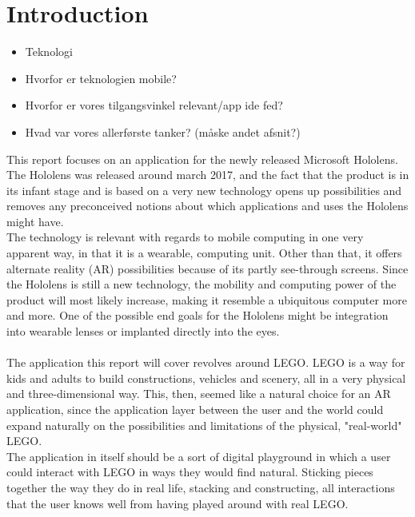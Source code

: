 
\section{Introduction}
\begin{itemize}
\item Teknologi
\item Hvorfor er teknologien mobile?
\item Hvorfor er vores tilgangsvinkel relevant/app ide fed?
\item Hvad var vores allerførste tanker? (måske andet afsnit?)
\end{itemize}

This report focuses on an application for the newly released Microsoft Hololens. The Hololens was released around march 2017, and the fact that the product is in its infant stage and is based on a very new technology opens up possibilities and removes any preconceived notions about which applications and uses the Hololens might have.\\
The technology is relevant with regards to mobile computing in one very apparent way, in that it is a wearable, computing unit. Other than that, it offers alternate reality (AR) possibilities because of its partly see-through screens. Since the Hololens is still a new technology, the mobility and computing power of the product will most likely increase, making it resemble a ubiquitous computer more and more. One of the possible end goals for the Hololens might be integration into wearable lenses or implanted directly into the eyes.\\\\
The application this report will cover revolves around LEGO. LEGO is a way for kids and adults to build constructions, vehicles and scenery, all in a very physical and three-dimensional way. This, then, seemed like a natural choice for an AR application, since the application layer between the user and the world could expand naturally on the possibilities and limitations of the physical, "real-world" LEGO.\\
The application in itself should be a sort of digital playground in which a user could interact with LEGO in ways they would find natural. Sticking pieces together the way they do in real life, stacking and constructing, all interactions that the user knows well from having played around with real LEGO. 